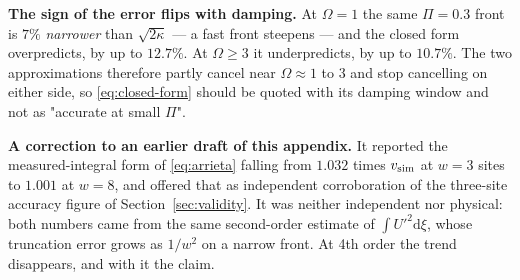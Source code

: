 \textbf{The sign of the error flips with damping.} At $\Omega = 1$ the same $\Pi = 0.3$
front is $7\%$ \emph{narrower} than $\sqrt{2\kappa}$ --- a fast front steepens --- and
the closed form overpredicts, by up to $12.7\%$. At $\Omega \ge 3$ it underpredicts, by
up to $10.7\%$. The two approximations therefore partly cancel near $\Omega \approx 1$
to $3$ and stop cancelling on either side, so \eqref{eq:closed-form} should be quoted
with its damping window and not as "accurate at small $\Pi$".

\textbf{A correction to an earlier draft of this appendix.} It reported the
measured-integral form of \eqref{eq:arrieta} falling from $1.032$ times $v_{\rm sim}$ at
$w = 3$ sites to $1.001$ at $w = 8$, and
offered that as independent corroboration of the three-site accuracy figure of
Section~\ref{sec:validity}. It was neither independent nor physical: both numbers came from
the same second-order estimate of $\int U'^2\mathrm{d}\xi$, whose truncation error grows as
$1/w^2$ on a narrow front. At 4th order the trend disappears, and with it the claim.

%
%

